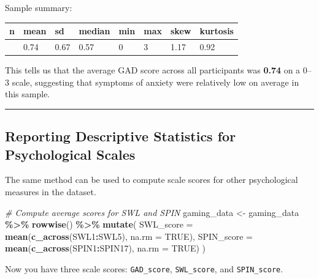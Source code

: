 \documentclass[
]{book}
\newenvironment{Shaded}{\begin{snugshade}}{\end{snugshade}}
\newcommand{\AttributeTok}[1]{\textcolor[rgb]{0.13,0.29,0.53}{#1}}
\newcommand{\CommentTok}[1]{\textcolor[rgb]{0.56,0.35,0.01}{\textit{#1}}}
\newcommand{\ConstantTok}[1]{\textcolor[rgb]{0.56,0.35,0.01}{#1}}
\newcommand{\FunctionTok}[1]{\textcolor[rgb]{0.13,0.29,0.53}{\textbf{#1}}}
\newcommand{\NormalTok}[1]{#1}
\newcommand{\OtherTok}[1]{\textcolor[rgb]{0.56,0.35,0.01}{#1}}
\newcommand{\SpecialCharTok}[1]{\textcolor[rgb]{0.81,0.36,0.00}{\textbf{#1}}}
\begin{document}
Sample summary:

\begin{longtable}[]{@{}llllllll@{}}
\toprule\noalign{}
n & mean & sd & median & min & max & skew & kurtosis \\
\midrule\noalign{}
\endhead
\bottomrule\noalign{}
\endlastfoot
13464 & 0.74 & 0.67 & 0.57 & 0 & 3 & 1.17 & 0.92 \\
\end{longtable}

This tells us that the average GAD score across all participants was \textbf{0.74} on a 0--3 scale, suggesting that symptoms of anxiety were relatively low on average in this sample.

\begin{center}\rule{0.5\linewidth}{0.5pt}\end{center}

\subsection*{\texorpdfstring{\textbf{Reporting Descriptive Statistics for Psychological Scales}}{Reporting Descriptive Statistics for Psychological Scales}}\label{reporting-descriptive-statistics-for-psychological-scales}

The same method can be used to compute scale scores for other psychological measures in the dataset.

\begin{Shaded}
\begin{Highlighting}[]
\CommentTok{\# Compute average scores for SWL and SPIN}
\NormalTok{gaming\_data }\OtherTok{\textless{}{-}}\NormalTok{ gaming\_data }\SpecialCharTok{\%\textgreater{}\%}
  \FunctionTok{rowwise}\NormalTok{() }\SpecialCharTok{\%\textgreater{}\%}
  \FunctionTok{mutate}\NormalTok{(}
    \AttributeTok{SWL\_score =} \FunctionTok{mean}\NormalTok{(}\FunctionTok{c\_across}\NormalTok{(SWL1}\SpecialCharTok{:}\NormalTok{SWL5), }\AttributeTok{na.rm =} \ConstantTok{TRUE}\NormalTok{),}
    \AttributeTok{SPIN\_score =} \FunctionTok{mean}\NormalTok{(}\FunctionTok{c\_across}\NormalTok{(SPIN1}\SpecialCharTok{:}\NormalTok{SPIN17), }\AttributeTok{na.rm =} \ConstantTok{TRUE}\NormalTok{)}
\NormalTok{  )}
\end{Highlighting}
\end{Shaded}

Now you have three scale scores: \texttt{GAD\_score}, \texttt{SWL\_score}, and \texttt{SPIN\_score}.
\end{document}
